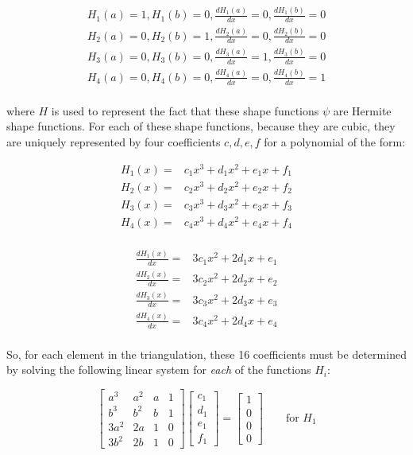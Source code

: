 \documentclass[10pt]{article}
\newcommand{\beq}{\begin{equation}}
\newcommand{\eeq}{\end{equation}}
\newcommand{\beqa}{\begin{equation}\begin{aligned}}
\newcommand{\eeqa}{\end{aligned}\end{equation}}
\begin{document}
\beqa
\label{eq:5}
H_1(a)=1, H_1(b)=0, \frac{dH_1(a)}{dx}=0, \frac{dH_1(b)}{dx}=0\\
H_2(a)=0, H_2(b)=1, \frac{dH_2(a)}{dx}=0, \frac{dH_2(b)}{dx}=0\\
H_3(a)=0, H_3(b)=0, \frac{dH_3(a)}{dx}=1, \frac{dH_3(b)}{dx}=0\\
H_4(a)=0, H_4(b)=0, \frac{dH_4(a)}{dx}=0, \frac{dH_4(b)}{dx}=1\\
\eeqa

where \(H\) is used to represent the fact that these shape functions \(\psi\) are Hermite shape functions. For each of these shape functions, because they are cubic, they are uniquely represented by four coefficients \(c, d, e, f\) for a polynomial of the form:

\beqa
H_1(x)=&c_1x^3+d_1x^2+e_1x+f_1\\
H_2(x)=&c_2x^3+d_2x^2+e_2x+f_2\\
H_3(x)=&c_3x^3+d_3x^2+e_3x+f_3\\
H_4(x)=&c_4x^3+d_4x^2+e_4x+f_4\\
\eeqa

\beqa
\frac{dH_1(x)}{dx}=&3c_1x^2+2d_1x+e_1\\
\frac{dH_2(x)}{dx}=&3c_2x^2+2d_2x+e_2\\
\frac{dH_3(x)}{dx}=&3c_3x^2+2d_3x+e_3\\
\frac{dH_4(x)}{dx}=&3c_4x^2+2d_4x+e_4\\
\eeqa

So, for each element in the triangulation, these 16 coefficients must be determined by solving the following linear system for \textit{each} of the functions \(H_i\):

\beq
\begin{bmatrix}
a^3 & a^2 & a & 1\\
b^3 & b^2 & b & 1\\
3a^2 & 2a & 1 & 0\\
3b^2 & 2b & 1 & 0
\end{bmatrix}
\begin{bmatrix}
c_1 \\d_1 \\e_1 \\f_1
\end{bmatrix}
=
\begin{bmatrix}
1 \\ 0 \\ 0 \\ 0
\end{bmatrix}
\quad\quad \textrm{for } H_1
\eeq
\end{document}
